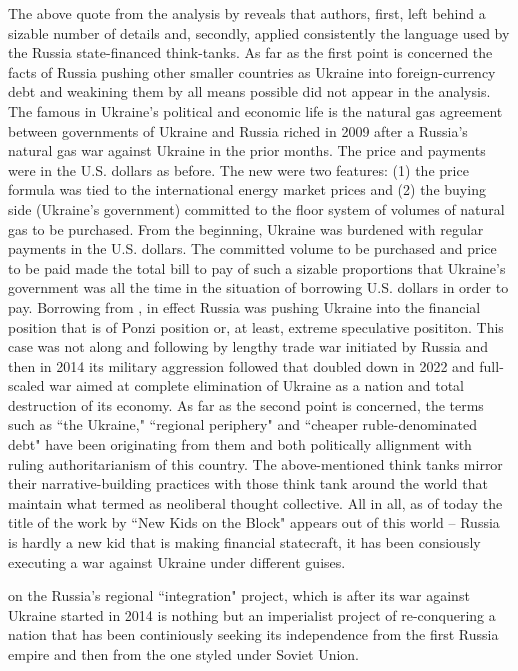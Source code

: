 The above quote from the analysis by \citeauthor{katada2014} reveals that authors, first, left behind a sizable number of details and, secondly, applied consistently the language used by the Russia state-financed think-tanks. As far as the first point is concerned the facts of Russia pushing other smaller countries as Ukraine into foreign-currency debt and weakining them by all means possible did not appear in the analysis. The famous in Ukraine's political and economic life is the natural gas agreement between governments of Ukraine and Russia riched in 2009 after a Russia's natural gas war against Ukraine in the prior months. The price and payments were in the U.S. dollars as before. The new were two features: (1) the price formula was tied to the international energy market prices and (2) the buying side (Ukraine's government) committed to the floor system of volumes of natural gas to be purchased. From the beginning, Ukraine was burdened with regular payments in the U.S. dollars. The committed volume to be purchased and price to be paid made the total bill to pay of such a sizable proportions that Ukraine's government was all the time in the situation of borrowing U.S. dollars in order to pay. Borrowing from \citeauthor{kregel2019}, in effect Russia was pushing Ukraine into the financial position that is of Ponzi position or, at least, extreme speculative posititon. This case was not along and following by lengthy trade war initiated by Russia and then in 2014 its military aggression followed that doubled down in 2022 and full-scaled war aimed at complete elimination of Ukraine as a nation and total destruction of its economy. As far as the second point is concerned, the terms such as ``the Ukraine," ``regional periphery" and ``cheaper ruble-denominated debt" have been originating from them and both politically allignment with ruling authoritarianism of this country. The above-mentioned think tanks mirror their narrative-building practices with those think tank around the world that maintain what \citeauthor{mirowski2009} termed as neoliberal thought collective. All in all, as of today the title of the work by \citeauthor{katada2014} ``New Kids on the Block" appears out of this world -- Russia is hardly a new kid that is making financial statecraft, it has been consiously executing a war against Ukraine under different guises.  

\cite{hancock2009} on the Russia's regional ``integration" project, which is after its war against Ukraine started in 2014 is nothing but an imperialist project of re-conquering a nation that has been continiously seeking its independence from the first Russia empire and then from the one styled under Soviet Union.


